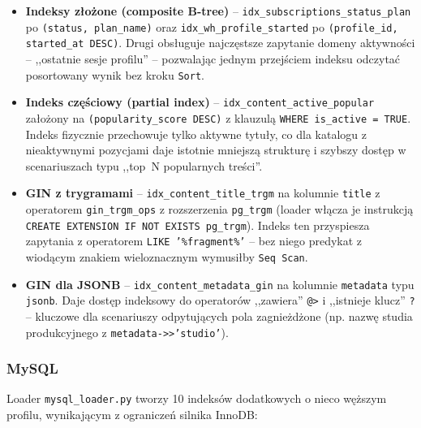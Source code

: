 \begin{itemize}
    \item \textbf{Indeksy złożone (composite B-tree)} --
    \texttt{idx\_subscriptions\_status\_plan} po
    \texttt{(status, plan\_name)} oraz
    \texttt{idx\_wh\_profile\_started} po
    \texttt{(profile\_id, started\_at DESC)}. Drugi obsługuje
    najczęstsze zapytanie domeny aktywności -- ,,ostatnie sesje
    profilu'' -- pozwalając jednym przejściem indeksu odczytać
    posortowany wynik bez kroku \texttt{Sort}.
    \item \textbf{Indeks częściowy (partial index)} --
    \texttt{idx\_content\_active\_popular} założony
    na \texttt{(popularity\_score DESC)} z klauzulą
    \texttt{WHERE is\_active = TRUE}. Indeks fizycznie
    przechowuje tylko aktywne tytuły, co dla katalogu z
    nieaktywnymi pozycjami daje istotnie mniejszą strukturę
    i szybszy dostęp w scenariuszach typu ,,top~N popularnych
    treści''.
    \item \textbf{GIN z trygramami} --
    \texttt{idx\_content\_title\_trgm} na kolumnie
    \texttt{title} z operatorem \texttt{gin\_trgm\_ops}
    z rozszerzenia \texttt{pg\_trgm} (loader włącza je
    instrukcją \texttt{CREATE EXTENSION IF NOT EXISTS pg\_trgm}).
    Indeks ten przyspiesza zapytania z operatorem
    \texttt{LIKE '\%fragment\%'} -- bez niego predykat z wiodącym
    znakiem wieloznacznym wymusiłby \texttt{Seq Scan}.
    \item \textbf{GIN dla JSONB} --
    \texttt{idx\_content\_metadata\_gin} na kolumnie
    \texttt{metadata} typu \texttt{jsonb}. Daje dostęp
    indeksowy do operatorów ,,zawiera'' \texttt{@>}
    i ,,istnieje klucz'' \texttt{?} -- kluczowe dla scenariuszy
    odpytujących pola zagnieżdżone (np. nazwę studia
    produkcyjnego z \texttt{metadata->>'studio'}).
\end{itemize}

\subsubsection*{MySQL}

Loader \texttt{mysql\_loader.py} tworzy 10 indeksów dodatkowych
o nieco węższym profilu, wynikającym z ograniczeń
silnika InnoDB:

